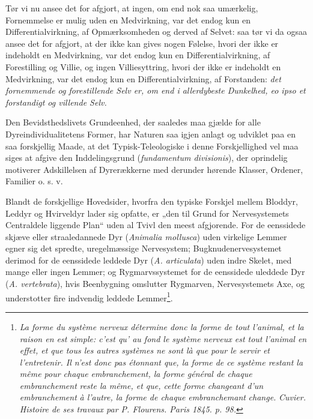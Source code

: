 \documentclass[11pt]{book}
\newcommand{\opage}[1]{\marginnote{\footnotesize\textit{[#1]}}}
\begin{document}
\opage{377} \setcounter{footnote}{0}%
Tør vi nu ansee det for afgjort, at ingen, om end nok saa umærkelig,
Fornemmelse er mulig uden en Medvirkning, var det endog kun en
Differentialvirkning, af Opmærksomheden og derved af Selvet: saa tør
vi da ogsaa ansee det for afgjort, at der ikke kan gives nogen
Følelse, hvori der ikke er indeholdt en Medvirkning, var det endog
kun en Differentialvirkning, af Forestilling og Villie, og ingen
Villiesyttring, hvori der ikke er indeholdt en Medvirkning, var det
endog kun en Differentialvirkning, af Forstanden: \emph{det
fornemmende og forestillende Selv er, om end i allerdybeste
Dunkelhed, eo ipso et forstandigt og villende Selv.}

Den Bevidsthedslivets Grundeenhed, der saaledes maa gjælde for alle
Dyreindividualitetens Former, har Naturen saa igjen anlagt og
udviklet paa en saa forskjellig Maade, at det Typisk-Teleologiske i
denne Forskjellighed vel maa siges at afgive den Inddelingsgrund
(\textit{fundamentum divisionis}), der oprindelig motiverer
Adskillelsen af Dyrerækkerne med derunder hørende Klasser, Ordener,
Familier o. s. v.

Blandt de forskjellige Hovedsider, hvorfra den typiske Forskjel
mellem Bloddyr, Leddyr og Hvirveldyr lader sig opfatte, er „den til
Grund for Nervesystemets Centraldele liggende Plan“ uden al Tvivl den
meest afgjorende. For de eenssidede skjæve eller straaledannede Dyr
(\textit{Animalia mollusca}) uden virkelige Lemmer egner sig det
spredte, uregelmæssige Nervesystem; Bugknudenervesystemet derimod for
de eenssidede leddede Dyr (\textit{A. articulata}) uden indre Skelet,
med mange eller ingen Lemmer; og Rygmarvssystemet for de eenssidede
uleddede Dyr (\textit{A. vertebrata}), hvis Beenbygning omslutter
Rygmarven, Nervesystemets Axe, og understotter fire indvendig leddede
Lemmer\footnote{\textit{La forme du système nerveux détermine donc la
forme de tout l'animal, et la raison en est simple: c'est qu' au fond
le système nerveux est tout l'animal en effet, et que tous les autres
systèmes ne sont là que pour le servir et l'entretenir. Il n'est donc
pas étonnant que, la forme de ce système restant la même pour chaque}
\emph{\textit{embranchement}}\textit{, la forme général de chaque}
\emph{\textit{embranchement}} \textit{reste la même, et que, cette
forme changeant d'un} \emph{\textit{embranchement}} \textit{à
l'autre, la forme de chaque} \emph{\textit{embranchemant}}
\textit{change.} \emph{\textit{Cuvier.}} \textit{Histoire de ses
travaux par P. Flourens. Paris 1845. p. 98.}}.
\end{document}
